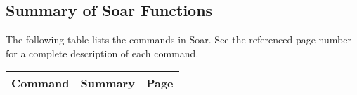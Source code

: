 \newpage
\newpage
\subsection*{Summary of Soar Functions}

The following table lists the commands in Soar. See the referenced page number
for a complete description of each command.

\begin{small}
\begin{longtable}{ l p{10cm} r }
Command  & Summary & Page \\  \hline

\end{longtable}
\end{small}


